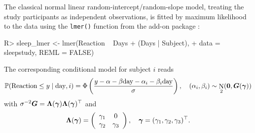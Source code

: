\documentclass[article,nojss,shortnames]{jss}\usepackage[]{graphicx}\usepackage[]{xcolor}
\newcommand{\cmd}[1]{\texttt{#1()}}
\newcommand{\ry}{y}
\newcommand{\varparm}{\gammavec}
\renewcommand{\Prob}{\mathbb{P}}
\DeclareMathOperator{\ND}{N}
\def \gammavec        {\text{\boldmath$\gamma$}}
\def \mLambda  {\mathbf{\Lambda}}
\def \nullvec {\mathbf{0}}
\begin{document}
The classical normal linear random-intercept/random-slope model, treating
the study participants as independent observations, is fitted by maximum
likelihood to the data using the \cmd{lmer} function from the 
add-on package \citep{pkg:lme4}:
%
\begin{Schunk}
\begin{Sinput}
R> sleep_lmer <- lmer(Reaction ~ Days + (Days | Subject), 
+                     data = sleepstudy, REML = FALSE)
\end{Sinput}
\end{Schunk}
%
The corresponding conditional model for subject $i$ reads
%
\begin{eqnarray*}
\Prob(\text{Reaction} \le \ry \mid \text{day}, i) = \Phi\left(\frac{\ry -
\alpha - \beta \text{day} - \alpha_i - \beta_i \text{day}}{\sigma}\right),
\quad (\alpha_i, \beta_i) \sim \ND_2(\nullvec, \mG(\varparm))
\end{eqnarray*}
%
with $\sigma^{-2}\mG = \mLambda(\varparm) \mLambda(\varparm)^\top$ and
%
\begin{eqnarray*}
\mLambda(\varparm) = \left( \begin{array}{cc}
    \gamma_1 & 0  \\
    \gamma_2 & \gamma_3
\end{array} \right), \quad \varparm = (\gamma_1, \gamma_2, \gamma_3)^\top.
\end{eqnarray*}
\end{document}
